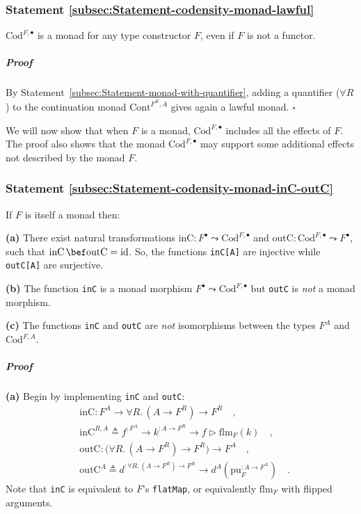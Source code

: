 \subsubsection{Statement \label{subsec:Statement-codensity-monad-lawful}\ref{subsec:Statement-codensity-monad-lawful}}

$\text{Cod}^{F,\bullet}$ is a monad for any type constructor $F$,
even if $F$ is not a functor.

\subparagraph{Proof}

By Statement~\ref{subsec:Statement-monad-with-quantifier}, adding
a quantifier ($\forall R$) to the continuation monad $\text{Cont}^{F^{R},A}$
gives again a lawful monad. $\square$

We will now show that when $F$ is a monad, $\text{Cod}^{F,\bullet}$
includes all the effects of $F$. The proof also shows that the monad
$\text{Cod}^{F,\bullet}$ may support some additional effects not
described by the monad $F$.

\subsubsection{Statement \label{subsec:Statement-codensity-monad-inC-outC}\ref{subsec:Statement-codensity-monad-inC-outC}}

If $F$ is itself a monad then:

\textbf{(a)} There exist natural transformations $\text{inC}:F^{\bullet}\leadsto\text{Cod}^{F,\bullet}$
and $\text{outC}:\text{Cod}^{F,\bullet}\leadsto F^{\bullet}$, such
that $\text{inC}\,\bef\text{outC}=\text{id}$. So, the functions \lstinline!inC[A]!
are injective while \lstinline!outC[A]! are surjective.

\textbf{(b)} The function \lstinline!inC! is a monad morphism $F^{\bullet}\leadsto\text{Cod}^{F,\bullet}$
but \lstinline!outC! is \emph{not} a monad morphism.

\textbf{(c)} The functions \lstinline!inC! and \lstinline!outC!
are \emph{not} isomorphisms between the types $F^{A}$ and $\text{Cod}^{F,A}$.

\subparagraph{Proof}

\textbf{(a)} Begin by implementing \lstinline!inC! and \lstinline!outC!:
\begin{align*}
 & \text{inC}:F^{A}\rightarrow\forall R.\,(A\rightarrow F^{R})\rightarrow F^{R}\quad,\\
 & \text{inC}^{R,A}\triangleq f^{:F^{A}}\rightarrow k^{:A\rightarrow F^{R}}\rightarrow f\triangleright\text{flm}_{F}(k)\quad,\\
 & \text{outC}:\big(\forall R.\,(A\rightarrow F^{R})\rightarrow F^{R}\big)\rightarrow F^{A}\quad,\\
 & \text{outC}^{A}\triangleq d^{:\forall R.\,(A\rightarrow F^{R})\rightarrow F^{R}}\rightarrow d^{A}(\text{pu}_{F}^{:A\rightarrow F^{A}})\quad.
\end{align*}
Note that \lstinline!inC! is equivalent to $F$\textsf{'}s \lstinline!flatMap!,
or equivalently $\text{flm}_{F}$ with flipped arguments.

